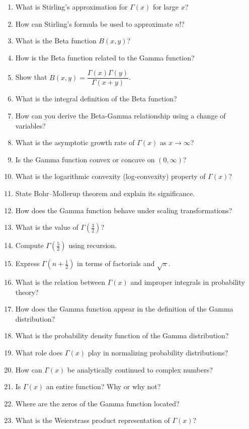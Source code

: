 \begin{enumerate}
  \item What is Stirling's approximation for \(\Gamma(x)\) for large \(x\)?
  \item How can Stirling's formula be used to approximate \(n!\)?
  \item What is the Beta function \(B(x,y)\)?
  \item How is the Beta function related to the Gamma function?
  \item Show that \(B(x,y) = \dfrac{\Gamma(x)\Gamma(y)}{\Gamma(x+y)}\).
  \item What is the integral definition of the Beta function?
  \item How can you derive the Beta-Gamma relationship using a change of variables?
  \item What is the asymptotic growth rate of \(\Gamma(x)\) as \(x \to \infty\)?
  \item Is the Gamma function convex or concave on \((0,\infty)\)?
  \item What is the logarithmic convexity (log-convexity) property of \(\Gamma(x)\)?
  \item State Bohr–Mollerup theorem and explain its significance.
  \item How does the Gamma function behave under scaling transformations?
  \item What is the value of \(\Gamma\left(\tfrac{3}{2}\right)\)?
  \item Compute \(\Gamma\left(\tfrac{5}{2}\right)\) using recursion.
  \item Express \(\Gamma\left(n+\tfrac{1}{2}\right)\) in terms of factorials and \(\sqrt{\pi}\).
  \item What is the relation between \(\Gamma(x)\) and improper integrals in probability theory?
  \item How does the Gamma function appear in the definition of the Gamma distribution?
  \item What is the probability density function of the Gamma distribution?
  \item What role does \(\Gamma(x)\) play in normalizing probability distributions?
  \item How can \(\Gamma(x)\) be analytically continued to complex numbers?
  \item Is \(\Gamma(x)\) an entire function? Why or why not?
  \item Where are the zeros of the Gamma function located?
  \item What is the Weierstrass product representation of \(\Gamma(x)\)?

\end{enumerate}
